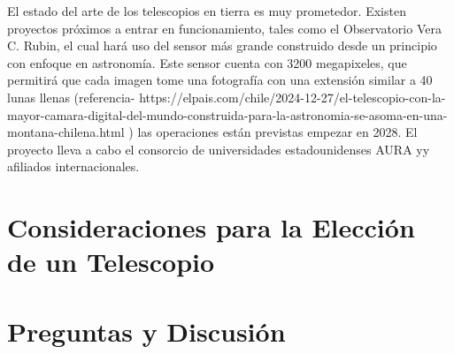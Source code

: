 El estado del arte de los telescopios en tierra es muy prometedor. Existen proyectos próximos a entrar en funcionamiento, tales como el Observatorio Vera C. Rubin, el cual hará uso del sensor más grande construido desde un principio con enfoque en astronomía. Este sensor cuenta con 3200 megapixeles, que permitirá que cada imagen tome una fotografía con una extensión similar a 40 lunas llenas (referencia- https://elpais.com/chile/2024-12-27/el-telescopio-con-la-mayor-camara-digital-del-mundo-construida-para-la-astronomia-se-asoma-en-una-montana-chilena.html ) las operaciones están previstas empezar en 2028. El proyecto lleva a cabo el consorcio de universidades estadounidenses AURA yy afiliados internacionales. 

\section{Consideraciones para la Elección de un Telescopio}

\section{Preguntas y Discusión}
